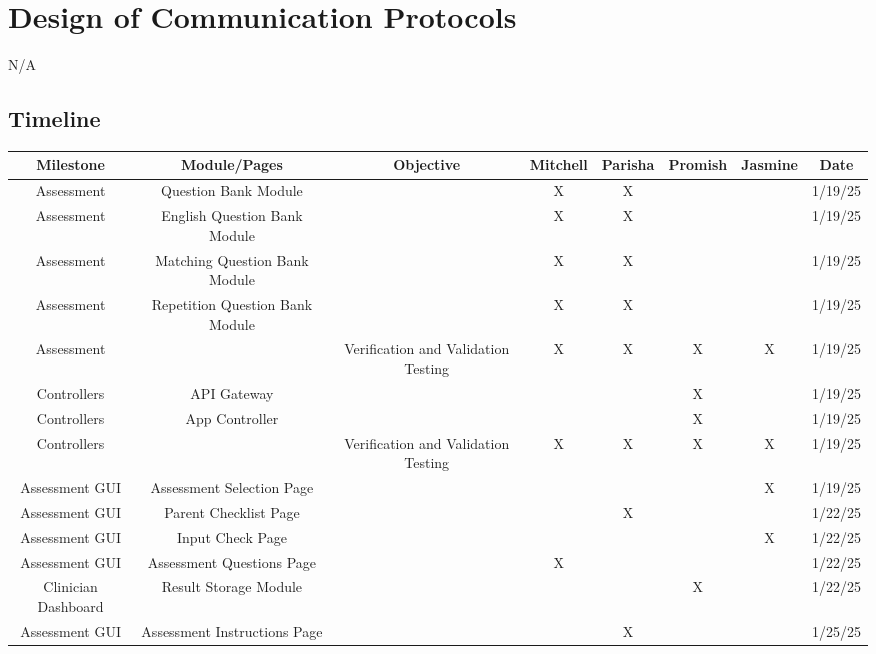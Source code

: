 \documentclass[12pt, titlepage]{article}
\begin{document}
\section{Design of Communication Protocols}

N/A

\newpage
\begin{landscape}
\section{Timeline}
\scriptsize
\begin{longtable}{|c|c|c|c|c|c|c|c|}
  \hline
      \textbf{Milestone} & \textbf{Module/Pages} & \textbf{Objective} & \textbf{Mitchell} & \textbf{Parisha} & \textbf{Promish} & \textbf{Jasmine} & \textbf{Date} \\ \hline
      Assessment & Question Bank Module & ~ & X & X & ~ & ~ & 1/19/25 \\ \hline
      Assessment & English Question Bank  Module & ~ & X & X & ~ & ~ & 1/19/25 \\ \hline
      Assessment & Matching Question Bank  Module & ~ & X & X & ~ & ~ & 1/19/25 \\ \hline
      Assessment & Repetition Question Bank  Module & ~ & X & X & ~ & ~ & 1/19/25 \\ \hline
      Assessment & ~ & Verification and Validation Testing & X & X & X & X & 1/19/25 \\ \hline
      Controllers & API Gateway & ~ & ~ & ~ & X & ~ & 1/19/25 \\ \hline
      Controllers & App Controller & ~ & ~ & ~ & X & ~ & 1/19/25 \\ \hline
      Controllers & ~ & Verification and Validation Testing & X & X & X & X & 1/19/25 \\ \hline
      Assessment GUI & Assessment Selection Page & ~ & ~ & ~ & ~ & X & 1/19/25 \\ \hline
      Assessment GUI & Parent Checklist Page & ~ & ~ & X & ~ & ~ & 1/22/25 \\ \hline
      Assessment GUI & Input Check Page & ~ & ~ & ~ & ~ & X & 1/22/25 \\ \hline
      Assessment GUI & Assessment Questions Page & ~ & X & ~ & ~ & ~ & 1/22/25 \\ \hline
      Clinician Dashboard & Result Storage Module & ~ & ~ & ~ & X & ~ & 1/22/25 \\ \hline
      Assessment GUI & Assessment Instructions Page & ~ & ~ & X & ~ & ~ & 1/25/25 \\ \hline

\end{longtable}
\end{landscape}
\end{document}
